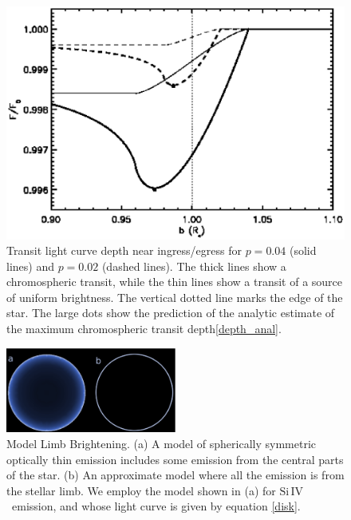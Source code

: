\documentclass[manuscript]{aastex}
\newcommand{\siIV}{\ensuremath{\mathrm{Si}\,\scriptstyle \mathrm{IV}}}
\begin{document}
\begin{figure}
\includegraphics[width=0.5 \textwidth]{comp_size.eps}
\caption{Transit light curve depth near ingress/egress
for $p=0.04$ (solid lines) and $p=0.02$ (dashed lines).
The thick lines show a chromospheric transit, while the
thin lines show a transit of a source of uniform brightness.
The vertical dotted line marks the edge of the star.
The large dots show the prediction of the analytic
estimate of the maximum chromospheric transit depth\ref{depth_anal}.}
\label{fig02}
\end{figure}


\begin{figure}
\begin{center}
\includegraphics[width=0.5\textwidth]{model_comparison.eps}
\caption{Model Limb Brightening. (a) A model of spherically symmetric optically thin emission includes some emission from the central parts of the star. (b) An approximate model where all the emission is from the stellar limb. We employ the model shown in (a) for \siIV\ emission, and whose light curve is given by  equation \ref{disk}.}
\label{limbmodel}
\end{center}
\end{figure}
\end{document}

